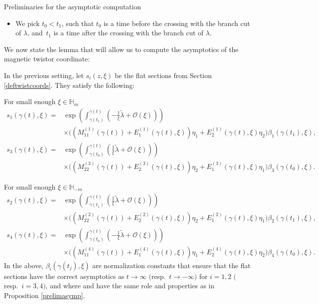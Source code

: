 \begin{subsubsection}{Preliminaries for the asymptotic computation}
\begin{itemize}
 \item We pick $t_0<t_1$, such that $t_0$ is a time before the crossing with the branch cut of $\lambda$, and~$ t_1$ is a time after the crossing with the branch cut of $\lambda$.
\end{itemize}

We now state the lemma that will allow us to compute the asymptotics of the magnetic twistor coordinate:

\begin{Lemma}\label{asympform} In the previous setting, let $s_i(z,\xi)$ be the flat sections from Section {\rm\ref{deftwistcoords}}. They satisfy the following:

For small enough $\xi \in \mathbb{H}_m$
\begin{align*}
 s_1(\gamma(t),\xi)={}& \exp \left(\int_{\gamma(t_1)}^{\gamma(t)}\left(-\frac{1}{\xi}\widetilde{\lambda}+\mathcal{O}(\xi)\right)\right)\\
 &\times
 \bigl((M_{11}^{(1)}(\gamma(t))+E^{(1)}_{1}(\gamma(t),\xi))\eta_1 + E^{(1)}_{2}(\gamma(t),\xi)\eta_2\bigr)\beta_1(\gamma(t_1),\xi),\\
 s_3(\gamma(t),\xi)={}& \exp \left(\int_{\gamma(t_0)}^{\gamma(t)}\left(\frac{1}{\xi}\widetilde{\lambda}+\mathcal{O}(\xi)\right)\right)\\
 &\times\bigl((M_{22}^{(3)}(\gamma(t))+E^{(3)}_{2}(\gamma(t),\xi))\eta_2 + E^{(3)}_{1}(\gamma(t),\xi)\eta_1\bigr)\beta_3(\gamma(t_0),\xi).
\end{align*}

For small enough $\xi \in \mathbb{H}_{-m}$
\begin{align*}
 s_2(\gamma(t),\xi)={}& \exp \left(\int_{\gamma(t_1)}^{\gamma(t)}\left(\frac{1}{\xi}\widetilde{\lambda}+\mathcal{O}(\xi)\right)\right)\\
 &\times
 \bigl((M_{22}^{(2)}(\gamma(t))+E^{(2)}_{2}(\gamma(t),\xi))\eta_2 + E^{(2)}_{1}(\gamma(t),\xi)\eta_1\bigr)\beta_2(\gamma(t_1),\xi),\\
 s_4(\gamma(t),\xi)={}& \exp \left(\int_{\gamma(t_0)}^{\gamma(t)}\left(-\frac{1}{\xi}\widetilde{\lambda}+\mathcal{O}(\xi)\right)\right)\\
 &\times
 \bigl((M_{11}^{(4)}(\gamma(t))+E^{(4)}_{1}(\gamma(t),\xi))\eta_1 + E^{(4)}_{2}(\gamma(t),\xi)\eta_2\bigr)\beta_4(\gamma(t_0),\xi).
\end{align*}
In the above, $\beta_i(\gamma(t_j),\xi)$ are normalization constants that ensure that the flat sections have the correct asymptotics as $t \to \infty$ $($resp.\ $t\to -\infty)$ for $i=1,2$ $($resp.\ $i=3,4)$, and where  and  have the same role and properties as in Proposition {\rm\ref{prelimasymp}}.


\end{Lemma}
\end{subsubsection}
